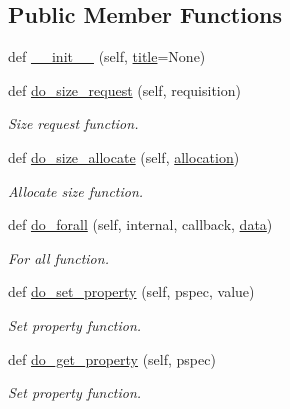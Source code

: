 \subsection*{Public Member Functions}
\begin{DoxyCompactItemize}
\item 
def \hyperlink{classvisualizer_1_1higcontainer_1_1HIGContainer_a5b74e8b83833b2c0463221f6b0849172}{\+\_\+\+\_\+init\+\_\+\+\_\+} (self, \hyperlink{lte__link__budget__x2__handover__measures_8m_a3f4b991df405379f6917e1683ed5a8c8}{title}=None)
\item 
def \hyperlink{classvisualizer_1_1higcontainer_1_1HIGContainer_ac8ab20b09ef63bf16da6817ac0c81185}{do\+\_\+size\+\_\+request} (self, requisition)
\begin{DoxyCompactList}\small\item\em Size request function. \end{DoxyCompactList}\item 
def \hyperlink{classvisualizer_1_1higcontainer_1_1HIGContainer_a49ccf125b7707273f575c854d1f69ae9}{do\+\_\+size\+\_\+allocate} (self, \hyperlink{classvisualizer_1_1higcontainer_1_1HIGContainer_af0d4a951cf5815dc69d44bea5d450c59}{allocation})
\begin{DoxyCompactList}\small\item\em Allocate size function. \end{DoxyCompactList}\item 
def \hyperlink{classvisualizer_1_1higcontainer_1_1HIGContainer_a9b226d776164eb1af04a579e4cd200d5}{do\+\_\+forall} (self, internal, callback, \hyperlink{topology-example-sim_8cc_a26c65296e316af77b787dc77469bb2a4}{data})
\begin{DoxyCompactList}\small\item\em For all function. \end{DoxyCompactList}\item 
def \hyperlink{classvisualizer_1_1higcontainer_1_1HIGContainer_a5af2c539dd5199c7acaa04d709de9505}{do\+\_\+set\+\_\+property} (self, pspec, value)
\begin{DoxyCompactList}\small\item\em Set property function. \end{DoxyCompactList}\item 
def \hyperlink{classvisualizer_1_1higcontainer_1_1HIGContainer_af9fa0c22c4b4f620f24d6630e240db11}{do\+\_\+get\+\_\+property} (self, pspec)
\begin{DoxyCompactList}\small\item\em Set property function. \end{DoxyCompactList}\end{DoxyCompactItemize}
